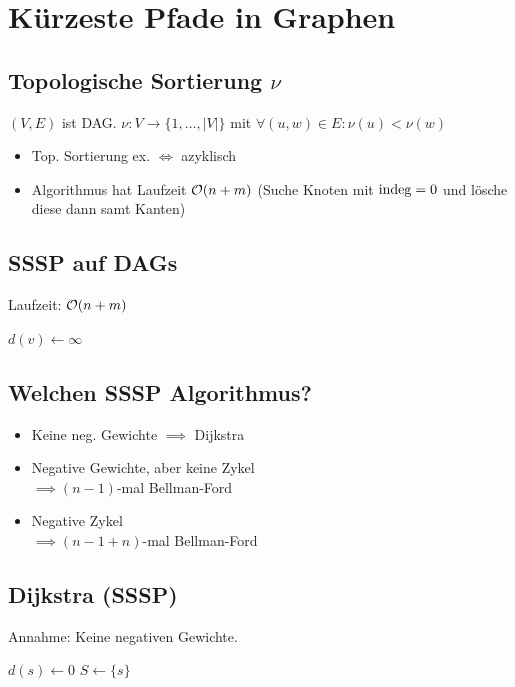 \section*{Kürzeste Pfade in Graphen}

\subsection*{Topologische Sortierung $\nu$}
$(V,E)$ ist DAG. $\nu: V \to \{1,\ldots,|V|\}$ mit
$\forall (u,w)\in E: \nu(u) < \nu(w)$

\begin{itemize}
	\item Top. Sortierung ex. $\iff$ azyklisch
	\item Algorithmus hat Laufzeit $\mathcal{O}(n+m)$
		(Suche Knoten mit $\operatorname{indeg}=0$ und lösche diese dann samt Kanten)
\end{itemize}

\subsection*{SSSP auf DAGs}
Laufzeit: $\mathcal{O}(n+m)$

\begin{algorithm}[H]
	 {
		$d(v) \gets \infty$\;
		
	}
\end{algorithm}

\subsection*{Welchen SSSP Algorithmus?}
\begin{itemize}
	\item Keine neg. Gewichte $\implies$ Dijkstra
	\item Negative Gewichte, aber keine Zykel\\ $\implies (n-1)$-mal Bellman-Ford
	\item Negative Zykel\\ $\implies (n-1+n)$-mal Bellman-Ford
\end{itemize}

\subsection*{Dijkstra (SSSP)}
Annahme: Keine negativen Gewichte.
\begin{algorithm}[H]
	$d(s) \gets 0$\;
	$S \gets \{s\}$\;
\end{algorithm}

